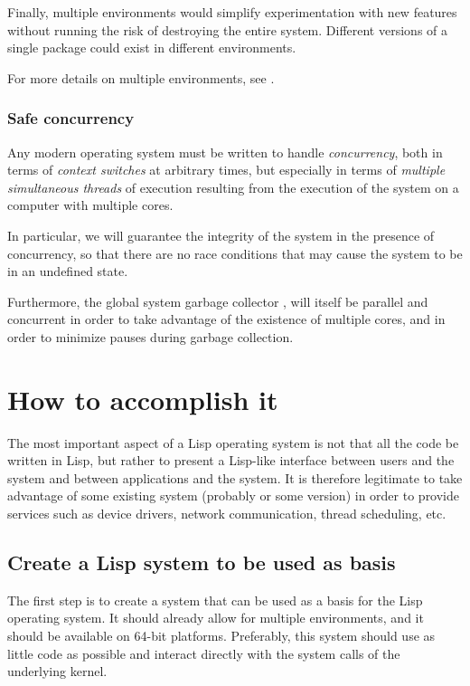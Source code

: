 Finally, multiple environments would simplify experimentation with
new features without running the risk of destroying the entire
system.  Different versions of a single package could exist in
different environments.

For more details on multiple environments, see
.

\subsubsection{Safe concurrency}

Any modern operating system must be written to handle
\emph{concurrency}, both in terms of \emph{context switches} at
arbitrary times, but especially in terms of \emph{multiple
  simultaneous threads} of execution resulting from the execution of
the system on a computer with multiple cores.

In particular, we will guarantee the integrity of the system in the
presence of concurrency, so that there are no race conditions that may
cause the system to be in an undefined state.

Furthermore, the global system garbage collector
, will itself be parallel and
concurrent in order to take advantage of the existence of multiple
cores, and in order to minimize pauses during garbage collection.

\section{How to accomplish it}

The most important aspect of a Lisp operating system is not that all
the code be written in Lisp, but rather to present a Lisp-like
interface between users and the system and between applications and
the system.  It is therefore legitimate to take advantage of some
existing system (probably \linux{} or some \bsd{} version) in order to
provide services such as device drivers, network communication, thread
scheduling, etc.

\subsection{Create a Lisp system to be used as basis}

The first step is to create a \commonlisp{} system that can be used as a basis
for the Lisp operating system.  It should already allow for multiple
environments, and it should be available on 64-bit platforms.
Preferably, this system should use as little \clanguage{} code as
possible and interact directly with the system calls of the underlying
kernel.


